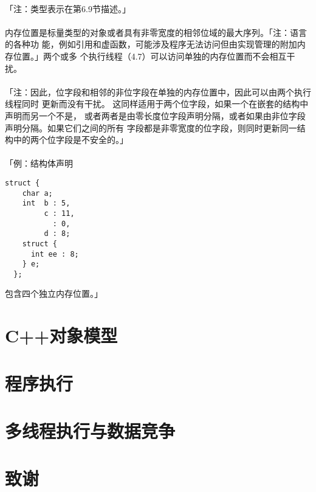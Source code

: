 \paragraph{}
「注：类型表示在第6.9节描述。」

\paragraph{}
内存位置是标量类型的对象或者具有非零宽度的相邻位域的最大序列。「注：语言的各种功
能，例如引用和虚函数，可能涉及程序无法访问但由实现管理的附加内存位置。」两个或多
个执行线程（4.7）可以访问单独的内存位置而不会相互干扰。

\paragraph{}
「注：因此，位字段和相邻的非位字段在单独的内存位置中，因此可以由两个执行线程同时
更新而没有干扰。 这同样适用于两个位字段，如果一个在嵌套的结构中声明而另一个不是，
或者两者是由零长度位字段声明分隔，或者如果由非位字段声明分隔。如果它们之间的所有
字段都是非零宽度的位字段，则同时更新同一结构中的两个位字段是不安全的。」

\paragraph{}
「例：结构体声明
\begin{lstlisting}[mathescape]
  struct {
    char a;
    int  b : 5,
         c : 11,
           : 0,
         d : 8;
    struct {
      int ee : 8;
    } e;
  };
\end{lstlisting}
包含四个独立内存位置。」


\section{C++对象模型}
\section{程序执行}
\section{多线程执行与数据竞争}
\section{致谢}
